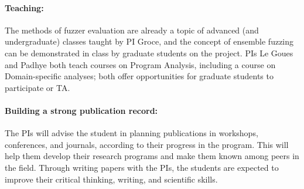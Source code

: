 \documentclass[12pt]{article}
\begin{document}
\paragraph{Teaching:}  The methods of fuzzer evaluation are already a topic of advanced (and undergraduate) classes taught by PI Groce, and the concept of ensemble fuzzing can be demonstrated in class by graduate students on the project.  PIs Le Goues and Padhye both teach courses on Program Analysis, including a course on Domain-specific analyses; both offer opportunities for graduate students to participate or TA. 


\paragraph{Building a strong publication record:}  The PIs will advise the student in planning publications in workshops, conferences, and journals, according to their progress in the program. This will help them develop their research programs and make them known among peers in the field. Through writing papers with the PIs, the students are expected to improve their critical thinking, writing, and scientific skills.
\end{document}
